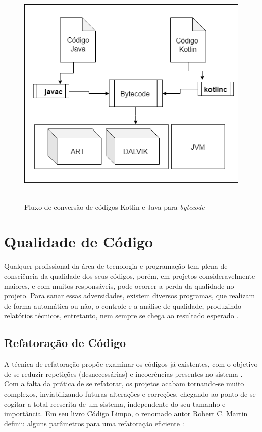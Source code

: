 \FloatBarrier
\begin{figure}[!htbp]
	\centering
		\caption{Fluxo de conversão de códigos Kotlin e Java para \textit{bytecode}} 
	\includegraphics[scale=0.5]{imagens/androidKotlinJVM}
 - \cite{SlideShare}
	\label{fig:figura4}
\end{figure}
\FloatBarrier


\section{Qualidade de Código}
Qualquer profissional da área de tecnologia e programação tem plena de consciência da qualidade dos seus códigos, porém, em projetos consideravelmente maiores, e com muitos responsáveis, pode ocorrer a perda da qualidade no projeto. Para sanar essas adversidades, existem diversos programas, que realizam de forma automática ou não, o controle e a análise de qualidade, produzindo relatórios técnicos, entretanto, nem sempre se chega ao resultado esperado \cite{qualidadedesoftware}. 

\subsection{Refatoração de Código}
A técnica de refatoração propõe examinar os códigos já existentes, com o objetivo de se reduzir repetições (desnecessárias) e incoerências presentes no sistema \cite{lindstrom2017refatoracao}. Com a falta da prática de se refatorar, os projetos acabam tornando-se muito complexos, inviabilizando futuras alterações e correções, chegando ao ponto de se cogitar a total reescrita de um sistema, independente do seu tamanho e importância. Em seu livro Código Limpo, o renomado autor Robert C. Martin definiu alguns parâmetros para uma refatoração eficiente \cite{ZanetteBeCodeCleanCode2017}: 

